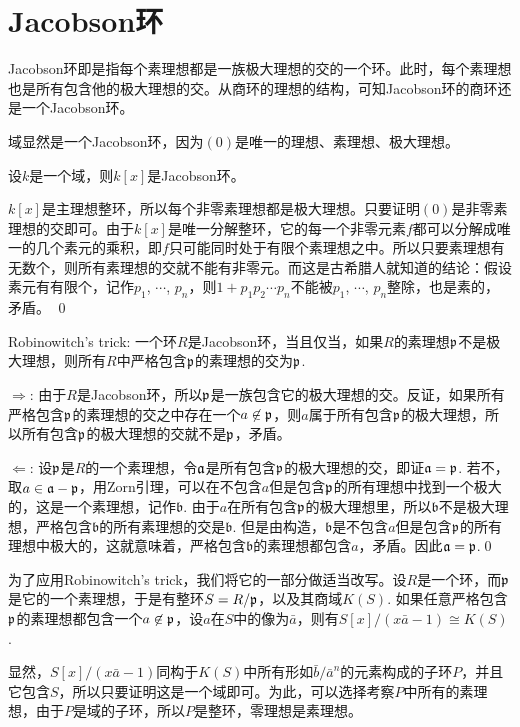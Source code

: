 \section{Jacobson环}

\para Jacobson环即是指每个素理想都是一族极大理想的交的一个环。此时，每个素理想也是所有包含他的极大理想的交。从商环的理想的结构，可知Jacobson环的商环还是一个Jacobson环。

域显然是一个Jacobson环，因为$(0)$是唯一的理想、素理想、极大理想。

\para 设$k$是一个域，则$k[x]$是Jacobson环。

\proof
	$k[x]$是主理想整环，所以每个非零素理想都是极大理想。只要证明$(0)$是非零素理想的交即可。由于$k[x]$是唯一分解整环，它的每一个非零元素$f$都可以分解成唯一的几个素元的乘积，即$f$只可能同时处于有限个素理想之中。所以只要素理想有无数个，则所有素理想的交就不能有非零元。而这是古希腊人就知道的结论：假设素元有有限个，记作$p_1$, $\cdots$, $p_n$，则$1+p_1p_2\cdots p_n$不能被$p_1$, $\cdots$, $p_n$整除，也是素的，矛盾。
\qed

\pro Robinowitch's trick: 一个环$R$是Jacobson环，当且仅当，如果$R$的素理想$\mathfrak{p}$不是极大理想，则所有$R$中严格包含$\mathfrak{p}$的素理想的交为$\mathfrak{p}$.

\proof $\Rightarrow$: 由于$R$是Jacobson环，所以$\mathfrak{p}$是一族包含它的极大理想的交。反证，如果所有严格包含$\mathfrak{p}$的素理想的交之中存在一个$a\not\in \mathfrak{p}$，则$a$属于所有包含$\mathfrak{p}$的极大理想，所以所有包含$\mathfrak{p}$的极大理想的交就不是$\mathfrak{p}$，矛盾。

$\Leftarrow$: 设$\mathfrak{p}$是$R$的一个素理想，令$\mathfrak{a}$是所有包含$\mathfrak{p}$的极大理想的交，即证$\mathfrak{a}=\mathfrak{p}$. 若不，取$a\in \mathfrak{a}-\mathfrak{p}$，用Zorn引理，可以在不包含$a$但是包含$\mathfrak{p}$的所有理想中找到一个极大的，这是一个素理想，记作$\mathfrak{b}$. 由于$a$在所有包含$\mathfrak{p}$的极大理想里，所以$\mathfrak{b}$不是极大理想，严格包含$\mathfrak{b}$的所有素理想的交是$\mathfrak{b}$. 但是由构造，$\mathfrak{b}$是不包含$a$但是包含$\mathfrak{p}$的所有理想中极大的，这就意味着，严格包含$\mathfrak{b}$的素理想都包含$a$，矛盾。因此$\mathfrak{a}=\mathfrak{p}$.\qed

为了应用Robinowitch's trick，我们将它的一部分做适当改写。设$R$是一个环，而$\mathfrak{p}$是它的一个素理想，于是有整环$S=R/\mathfrak{p}$，以及其商域$K(S)$. 如果任意严格包含$\mathfrak{p}$的素理想都包含一个$a\not\in \mathfrak{p}$，设$a$在$S$中的像为$\bar{a}$，则有$S[x]/(x\bar{a}-1)\cong K(S)$.

\proof 显然，$S[x]/(x\bar{a}-1)$同构于$K(S)$中所有形如$\bar{b}/\bar{a}^n$的元素构成的子环$P$，并且它包含$S$，所以只要证明这是一个域即可。为此，可以选择考察$P$中所有的素理想，由于$P$是域的子环，所以$P$是整环，零理想是素理想。


